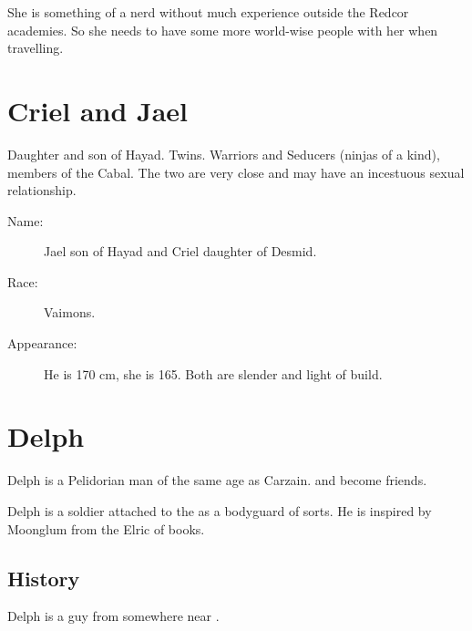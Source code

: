 She is something of a nerd without much experience outside the Redcor academies. 
So she needs to have some more world-wise people with her when travelling. 















\section{Criel and Jael}
Daughter and son of Hayad. Twins. Warriors and Seducers (ninjas of a kind), members of the Cabal. The two are very close and may have an incestuous sexual relationship. 

\begin{description}
  \item[Name:] Jael son of Hayad and Criel daughter of Desmid. 
  \item[Race:] Vaimons. 
  \item[Appearance:] He is 170 cm, she is 165. Both are slender and light of build. 
\end{description}















\section{Delph}
Delph is a Pelidorian \human{} man of the same age as Carzain.  and become friends. 

Delph is a soldier attached to the \ishrah{} as a bodyguard of sorts. He is inspired by Moonglum from the Elric of \Melnibone{} books. 







\subsection{History}
Delph is a \Tepharin{} guy from somewhere near \Malcur. 

